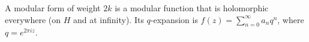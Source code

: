 A modular form of weight $2k$ is a modular function that is holomorphic everywhere (on $H$ and at infinity). Its $q$-expansion is $f(z) = \sum_{n=0}^{\infty} a_n q^n$, where $q = e^{2\pi i z}$.
